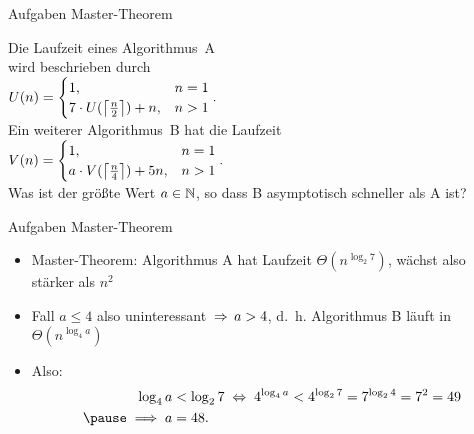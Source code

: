 \begin{frame}{Aufgaben Master-Theorem}
	\begin{wrapfigure}{r}[-.2\baselineskip]{.38\textwidth}
		\fbox{\mastertheoreminder}
	\end{wrapfigure}
	Die Laufzeit eines Algorithmus~A \\
	wird beschrieben durch \\ \smallskip
	\begin{math}
	U(n) = 
	\begin{cases}
	1,                           			   &n = 1 \\
	7 \cdot U(\left\lceil\frac{n}{2}\right\rceil) + n,  &  n > 1
	\end{cases}.
	\end{math} \\ \bigskip
	Ein weiterer Algorithmus~B hat die Laufzeit \\ \smallskip
	\begin{math}
	V(n) = 
	\begin{cases}
	1,                            				& n = 1 \\
	a \cdot V(\left\lceil\frac{n}{4}\right\rceil) + 5n,  & n > 1
	\end{cases}.
	\end{math} \\ \bigskip
	Was ist der größte Wert $a \in \mathbb{N}$, so dass B asymptotisch schneller als A ist?
\end{frame}

\begin{frame}{Aufgaben Master-Theorem}
	\solutionheading 
	\begin{itemize}
		\item Master-Theorem: Algorithmus A hat Laufzeit $\Theta(n^{\log _{2}7})$, wächst also stärker als $n^2$
		\pause
		\item Fall $a \leq 4$ also uninteressant $\impl a > 4$, d.~h. Algorithmus B läuft in $\Theta(n^{\log _{4}a})$ \\
		\pause 
		\item Also: 
		\begin{align*}
			\log_{4}a &< \log_{2}7 \gdw 4^{\log_{4}a} < 4^{\log_{2}7} = 7^{\log_{2} 4} = 7^2 = 49 \\ \pause  %
			\Impl a &= 48.
		\end{align*}
	\end{itemize}
\end{frame}


